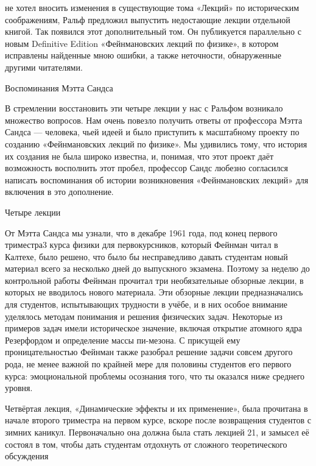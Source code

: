 \documentclass[11pt,oneside]{article}
\begin{document}
не хотел вносить изменения в существующие тома «Лекций» по историческим соображениям, Ральф предложил выпустить недостающие лекции отдельной книгой. Так появился этот дополнительный том. Он публикуется параллельно с новым Definitive Edition «Фейнмановских лекций по физике», в котором исправлены найденные мною ошибки, а также неточности, обнаруженные другими читателями.\par



Воспоминания Мэтта Сандса\par



В стремлении восстановить эти четыре лекции у нас с Ральфом возникало множество вопросов. Нам очень повезло получить ответы от профессора Мэтта Сандса --- человека, чьей идеей и было приступить к масштабному проекту по созданию «Фейнмановских лекций по физике». Мы удивились тому, что история их создания не была широко известна, и, понимая, что этот проект даёт возможность восполнить этот пробел, профессор Сандс любезно согласился написать воспоминания об истории возникновения «Фейнмановских лекций» для включения в это дополнение.\par



Четыре лекции\par



От Мэтта Сандса мы узнали, что в декабре 1961 года, под конец первого триместра3 курса физики для первокурсников, который Фейнман читал в Калтехе, было решено, что было бы несправедливо давать студентам новый материал всего за несколько дней до выпускного экзамена. Поэтому за неделю до контрольной работы Фейнман прочитал три необязательные обзорные лекции, в которых не вводилось нового материала. Эти обзорные лекции предназначались для студентов, испытывающих трудности в учёбе, и в них особое внимание уделялось методам понимания и решения физических задач. Некоторые из примеров задач имели историческое значение, включая открытие атомного ядра Резерфордом и определение массы пи-мезона. С присущей ему проницательностью Фейнман также разобрал решение задачи совсем другого рода, не менее важной по крайней мере для половины студентов его первого курса: эмоциональной проблемы осознания того, что ты оказался ниже среднего уровня.\par



Четвёртая лекция, «Динамические эффекты и их применение», была прочитана в начале второго триместра на первом курсе, вскоре после возвращения студентов с зимних каникул. Первоначально она должна была стать лекцией 21, и замысел её состоял в том, чтобы дать студентам отдохнуть от сложного теоретического обсуждения\par
\end{document}
